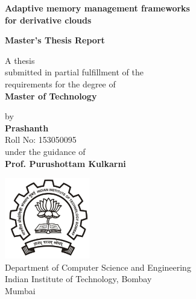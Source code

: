 \documentclass[11pt,a4paper]{report}
\newcommand{\putiitblogo}{\includegraphics[width=10em]{iitb-black}}
\begin{document}
  \begin{titlepage}    
    \begin{center}
   
      \huge \textbf{Adaptive memory management frameworks \\for derivative clouds}  \\
      \vspace{4em}
      
      \large \textbf{Master's Thesis Report} \\
      \vspace{5em}
      
      \normalsize A thesis \\submitted in partial fulfillment of the \\requirements for the degree of \\
      \vspace{1em}      
      \large \textbf{Master of Technology} \\
      \vspace{5em}
      
      \normalsize by \\
      \vspace{1em}      
      \large \textbf{Prashanth} \\ 
      \vspace{0.5em}
      \normalsize Roll No: 153050095 \\
      
      \vspace{5em}
      \normalsize under the guidance of \\
      \vspace{0.5em}      
      \large \textbf{Prof. Purushottam Kulkarni} \\
      \vspace{3em}
      
      \putiitblogo \\
      \Large 
      Department of Computer Science and Engineering \\
      Indian Institute of Technology, Bombay \\
      Mumbai
      
    \end{center}
  \end{titlepage} 
  
  
  
  
\end{document}
